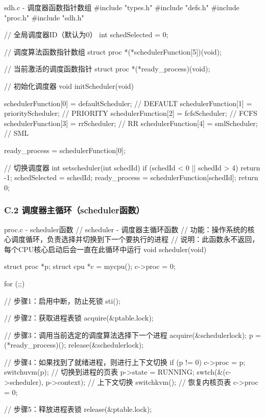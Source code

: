 \documentclass[a4paper, 12pt]{article}
\begin{document}
    \begin{codeblock}{sdh.c - 调度器函数指针数组}
#include "types.h"
#include "defs.h"
#include "proc.h"
#include "sdh.h"

// 全局调度器ID（默认为0）
int schedSelected = 0;

// 调度算法函数指针数组
struct proc *(*schedulerFunction[5])(void);

// 当前激活的调度函数指针
struct proc *(*ready_process)(void);

// 初始化调度器
void initScheduler(void) {
    schedulerFunction[0] = defaultScheduler;  // DEFAULT
    schedulerFunction[1] = priorityScheduler; // PRIORITY
    schedulerFunction[2] = fcfsScheduler;     // FCFS
    schedulerFunction[3] = rrScheduler;       // RR
    schedulerFunction[4] = smlScheduler;      // SML
    
    ready_process = schedulerFunction[0];
}

// 切换调度器
int setscheduler(int schedId) {
    if (schedId < 0 || schedId > 4) return -1;
    schedSelected = schedId;
    ready_process = schedulerFunction[schedId];
    return 0;
}
    \end{codeblock}
    
    \subsubsection{C.2 调度器主循环（scheduler函数）}
    
    \begin{codeblock}{proc.c - scheduler函数}
// scheduler - 调度器主循环函数
// 功能：操作系统的核心调度循环，负责选择并切换到下一个要执行的进程
// 说明：此函数永不返回，每个CPU核心启动后会一直在此循环中运行
void scheduler(void) {
    struct proc *p;
    struct cpu *c = mycpu();
    c->proc = 0;
    
    for (;;) {
        // 步骤1：启用中断，防止死锁
        sti();
        
        // 步骤2：获取进程表锁
        acquire(&ptable.lock);
        
        // 步骤3：调用当前选定的调度算法选择下一个进程
        acquire(&schedulerlock);
        p = (*ready_process)();
        release(&schedulerlock);
        
        // 步骤4：如果找到了就绪进程，则进行上下文切换
        if (p != 0) {
            c->proc = p;
            switchuvm(p);           // 切换到进程的页表
            p->state = RUNNING;
            swtch(&(c->scheduler), p->context);  // 上下文切换
            switchkvm();            // 恢复内核页表
            c->proc = 0;
        }
        
        // 步骤5：释放进程表锁
        release(&ptable.lock);
    }
}
    \end{codeblock}
    
\end{document}
